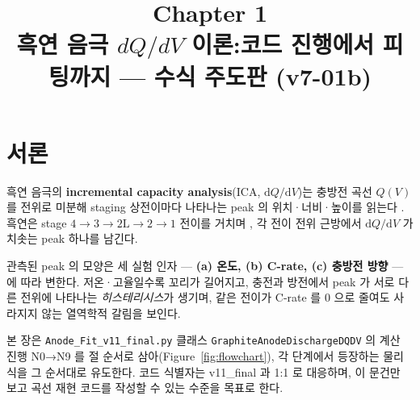 \documentclass[11pt,a4paper]{article}
\title{\textbf{\LARGE Chapter 1}\\[0.35em]
  \Large 흑연 음극 $dQ/dV$ 이론:\;코드 진행에서 피팅까지 — 수식 주도판 (v7-01b)}
\author{}
\date{}
\newcommand{\dd}{\mathrm{d}}
\begin{document}
\maketitle

\section*{서론}

흑연 음극의 \textbf{incremental capacity analysis}(ICA, $\dd Q/\dd V$)는 충방전
곡선 $Q(V)$ 를 전위로 미분해 staging 상전이마다 나타나는 peak 의 위치·너비·높이를
읽는다 \cite{bloom2005,dubarry2012}. 흑연은 stage $4\to3\to2\mathrm L\to2\to1$
전이를 거치며 \cite{dahn1991,ohzuku1993,funabiki1999}, 각 전이 전위 근방에서
$\dd Q/\dd V$ 가 치솟는 peak 하나를 남긴다.

관측된 peak 의 모양은 세 실험 인자 — \textbf{(a) 온도, (b) C-rate, (c) 충방전
방향} — 에 따라 변한다. 저온·고율일수록 꼬리가 길어지고, 충전과 방전에서 peak
가 서로 다른 전위에 나타나는 \emph{히스테리시스}가 생기며, 같은 전이가 C-rate
를 $0$ 으로 줄여도 사라지지 않는 열역학적 갈림을 보인다.

본 장은 \texttt{Anode\_Fit\_v11\_final.py} 클래스 \texttt{GraphiteAnodeDischargeDQDV}
의 계산 진행 N0→N9 를 절 순서로 삼아(Figure~\ref{fig:flowchart}), 각 단계에서
등장하는 물리식을 그 순서대로 유도한다. 코드 식별자는 v11\_final 과 1:1 로 대응하며,
이 문건만 보고 곡선 재현 코드를 작성할 수 있는 수준을 목표로 한다.
\end{document}
